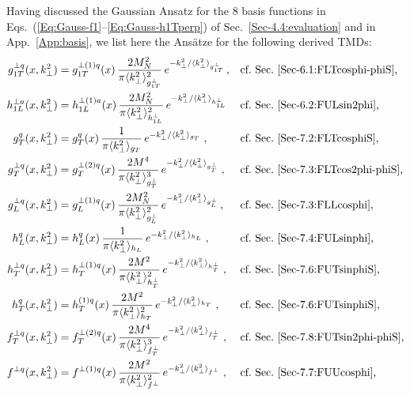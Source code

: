 \documentclass[a4paper,11pt]{article}
\newcommand{\la}{\langle}
\newcommand{\ra}{\rangle}
\def\kperp{k_\perp}
\def\avkperp{\la \kperp^2 \ra}
\begin{document}
Having discussed the Gaussian Ansatz for the 8 basis functions
in Eqs.~(\ref{Eq:Gauss-f1}--\ref{Eq:Gauss-h1Tperp}) of
Sec.~\ref{Sec-4.4:evaluation} and in App.~\ref{App:basis},
we list here the Ans\"atze for the following derived TMDs:
\begin{subequations}\begin{align}
	g_{1T}^{\perp q}(x,\kperp^2)
	  &=	g_{1T}^{\perp (1) q}(x)\,
		\frac{2 M_N^2}{\pi \avkperp_{g_{1T}^\perp}^2}\,
		e^{-\kperp^2/{\avkperp_{g_{1T}^\perp}}}  \,,
	  && 	\mbox{cf.\ Sec.~\ref{Sec-6.1:FLTcosphi-phiS},}
		\label{eq:g1t}\\
	h_{1L}^{\perp a}(x,\kperp^2)
	  &= 	h_{1L}^{\perp (1) a}(x)\,
		\frac{2 M_N^2}{\pi{\avkperp_{h_{1L}^\perp}^2}}\,
		e^{-\kperp^2/{\avkperp_{h_{1L}^\perp}}}
	  && 	\mbox{cf.\ Sec.~\ref{Sec-6.2:FULsin2phi},}	
		\label{eq:h1l_final}\\
	g^{q}_{T}(x,\kperp^2)
	  &=	g^{q}_{T}(x)\,\frac{1}{\pi \avkperp_{g_{T}}}\,
		e^{-\kperp^2/{\avkperp_{g_{T}}}}\;,
	  && 	\mbox{cf.\ Sec.~\ref{Sec-7.2:FLTcosphiS},}	
		\label{eq:gtnew} \\
	g^{\perp q}_{T}(x,\kperp^2)
	  &= 	g^{\perp (2) q}_{T}(x)\,\frac{2 M^4}{\pi \avkperp^3_{g_{T}^{\perp} }}\,
		e^{-\kperp^2/{\avkperp_{g_{T}^{\perp} }}}\;,
	  && 	\mbox{cf.\ Sec.~\ref{Sec-7.3:FLTcos2phi-phiS},}	
		\label{eq:gtperpnew} \\
	g_{L}^{\perp q}(x,\kperp^2)
	  &=	g_{L}^{\perp (1) q}(x)\,
		\frac{2 M_N^2}{\pi \avkperp_{g_{L}^\perp}^2}\,
		e^{-\kperp^2/{\avkperp_{g_{L}^\perp}}}  \,,
	  && 	\mbox{cf.\ Sec.~\ref{Sec-7.3:FLLcosphi},}
		\label{eq:gLperp} \\
	h_L^q(x,\kperp^2)
	  &= 	h_L^q(x) \,\frac{1}{\pi \avkperp_{h_{L}}}\,
		e^{-\kperp^2/{\avkperp_{h_{L}}}}\;,
	  && 	\mbox{cf.\ Sec.~\ref{Sec-7.4:FULsinphi},}
		\label{eq:hLnew}\\
	h_T^{\perp q}(x,\kperp^2)
	  &=	h_T^{\perp (1) q}(x)\,\frac{2 M^2}{\pi \avkperp_{h_{T}^\perp}^2}\,
	  	e^{-\kperp^2/{\avkperp_{h_{T}^\perp}}}\;,
	  && 	\mbox{cf.\ Sec.~\ref{Sec-7.6:FUTsinphiS},}
		\label{eq:hTperpnew}\\
	h_T^{q}(x,\kperp^2)
	  &=	h_T^{(1) q}(x) \,\frac{2 M^2}{\pi \avkperp_{h_{T}}^2}\,
		e^{-\kperp^2/{\avkperp_{h_{T}}}}\;,
	  && 	\mbox{cf.\ Sec.~\ref{Sec-7.6:FUTsinphiS},}
		\label{eq:hTnew}\\
	f^{\perp q}_{T}(x,\kperp^2)
	  &= 	f^{\perp (2) q}_{T}(x)\,\frac{2 M^4}{\pi \avkperp^3_{f_{T}^{\perp} }}\,
		e^{-\kperp^2/{\avkperp_{f_{T}^{\perp} }}}\;,
	  && 	\mbox{cf.\ Sec.~\ref{Sec-7.8:FUTsin2phi-phiS},}
		\label{eq:ftperpnew}\\
	f^{\perp q}(x,\kperp^2)
	  &= 	f^{\perp (1) q}(x) \,\frac{2 M^2}{\pi \avkperp_{f^\perp}^2}\,
		e^{-\kperp^2/{\avkperp_{f^\perp}}}\;,
	  && 	\mbox{cf.\ Sec.~\ref{Sec-7.7:FUUcosphi},}
		\label{eq:fperpnew}
\end{align}\end{subequations}
\end{document}
